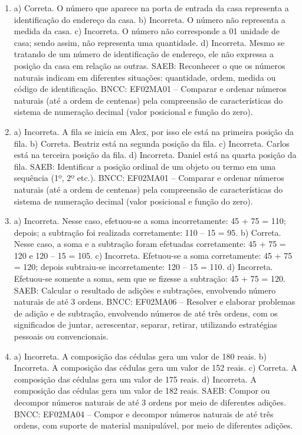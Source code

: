 \begin{enumerate}
\item
a) Correta. O número que aparece na porta de entrada da casa representa a identificação do endereço da casa.
b) Incorreta. O número não representa a medida da casa.
c) Incorreta. O número não corresponde a 01 unidade de casa; sendo assim, não representa uma quantidade.
d) Incorreta. Mesmo se tratando de um número de identificação de endereço, ele não expressa a posição da casa em relação as outras.
SAEB: Reconhecer o que os números naturais indicam em diferentes
situações: quantidade, ordem, medida ou código de identificação.
BNCC: EF02MA01 -- Comparar e ordenar números naturais (até a ordem de
centenas) pela compreensão de características do sistema de numeração
decimal (valor posicional e função do zero).

\item
a) Incorreta. A fila se inicia em Alex, por isso ele está na primeira posição da fila.
b) Correta. Beatriz está na segunda posição da fila.
c) Incorreta. Carlos está na terceira posição da fila.
d) Incorreta. Daniel está na quarta posição da fila.
SAEB: Identificar a posição ordinal de um objeto ou termo em uma
sequência (1º, 2º etc.).
BNCC: EF02MA01 -- Comparar e ordenar números naturais (até a ordem de
centenas) pela compreensão de características do sistema de numeração
decimal (valor posicional e função do zero).

\item
a) Incorreta. Nesse caso, efetuou-se a soma incorretamente: 45 + 75 = 110; depois; a subtração foi realizada corretamente: 110 -- 15 = 95.
b) Correta. Nesse caso, a soma e a subtração foram efetuadas corretamente: 45 + 75 = 120 e 120 -- 15 = 105.
c) Incorreta. Efetuou-se a soma corretamente: 45 + 75 = 120; depois
subtraiu-se incorretamente: 120 -- 15 = 110.
d) Incorreta. Efetuou-se somente a soma, sem que se fizesse a subtração: 45 + 75 = 120.
SAEB: Calcular o resultado de adições e subtrações, envolvendo
número naturais de até 3 ordens.
BNCC: EF02MA06 -- Resolver e elaborar problemas de adição e de subtração,
envolvendo números de até três ordens, com os significados de juntar,
acrescentar, separar, retirar, utilizando estratégias pessoais ou
convencionais.

\item
a) Incorreta. A composição das cédulas gera um valor de 180 reais.
b) Incorreta. A composição das cédulas gera um valor de 152 reais.
c) Correta. A composição das cédulas gera um valor de 175 reais.
d) Incorreta. A composição das cédulas gera um valor de 182 reais.
SAEB: Compor ou decompor números naturais de até 3 ordens por
meio de diferentes adições.
BNCC: EF02MA04 -- Compor e decompor números naturais de até três ordens,
com suporte de material manipulável, por meio de diferentes adições.


\end{enumerate}
